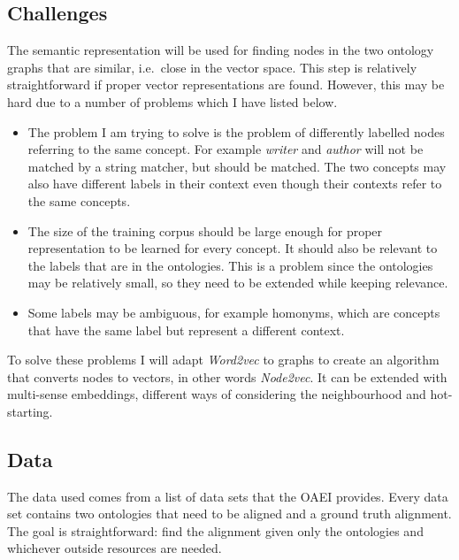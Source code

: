 \documentclass{article}
\begin{document}
 \subsection{Challenges}
 The semantic representation will be used for finding nodes in the two ontology graphs that are similar, i.e.\ close in the vector space. This step is relatively straightforward if proper vector representations are found. However, this may be hard due to a number of problems which I have listed below.

 \begin{itemize}
  \item The problem I am trying to solve is the problem of differently labelled nodes referring to the same concept. For example \emph{writer} and \emph{author} will not be matched by a string matcher, but should be matched. The two concepts may also have different labels in their context even though their contexts refer to the same concepts.
  \item The size of the training corpus should be large enough for proper representation to be learned for every concept. It should also be relevant to the labels that are in the ontologies. This is a problem since the ontologies may be relatively small, so they need to be extended while keeping relevance.
  \item Some labels may be ambiguous, for example homonyms, which are concepts that have the same label but represent a different context.
 \end{itemize}
 
 To solve these problems I will adapt \emph{Word2vec} to graphs to create an algorithm that converts nodes to vectors, in other words \emph{Node2vec}. It can be extended with multi-sense embeddings, different ways of considering the neighbourhood and hot-starting.
 
  \subsection{Data}
 The data used comes from a list of data sets that the OAEI provides\cite{euzenat2013ontology}. %
 Every data set contains two ontologies that need to be aligned and a ground truth alignment. The goal is straightforward: find the alignment given only the ontologies and whichever outside resources are needed.
\end{document}
